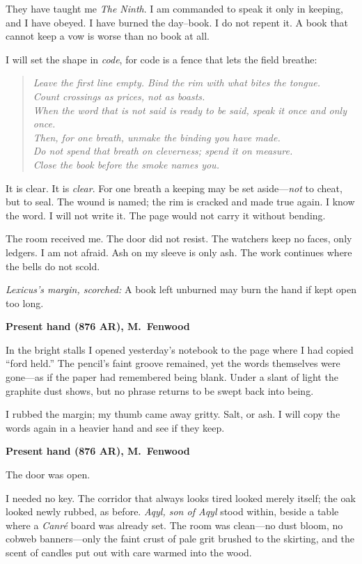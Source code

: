 \documentclass[11pt]{article}
\numberwithin{equation}{section} %
\theoremstyle{plain} %
\theoremstyle{definition} %
\theoremstyle{remark} %
\begin{document}
They have taught me \emph{The Ninth}. I am commanded to speak it only in keeping, and I have obeyed. I have burned the day–book. I do not repent it. A book that cannot keep a vow is worse than no book at all.

I will set the shape in \emph{code}, for code is a fence that lets the field breathe:

\begin{quote}\small
\textit{Leave the first line empty. Bind the rim with what bites the tongue.\\
Count crossings as prices, not as boasts.\\
When the word that is not said is ready to be said, speak it once and only once.\\
Then, for one breath, unmake the binding you have made.\\
Do not spend that breath on cleverness; spend it on measure.\\
Close the book before the smoke names you.}
\end{quote}

It is clear. It is \emph{clear}. For one breath a keeping may be set aside—\emph{not} to cheat, but to seal. The wound is named; the rim is cracked and made true again. I know the word. I will not write it. The page would not carry it without bending.

The room received me. The door did not resist. The watchers keep no faces, only ledgers. I am not afraid. Ash on my sleeve is only ash. The work continues where the bells do not scold.

\medskip
\noindent\textit{Lexicus’s margin, scorched:} A book left unburned may burn the hand if kept open too long.

\medskip
\noindent\textbf{Present hand (876 AR), M.\ Fenwood}

In the bright stalls I opened yesterday’s notebook to the page where I had copied “ford held.” The pencil’s faint groove remained, yet the words themselves were gone—as if the paper had remembered being blank. Under a slant of light the graphite dust shows, but no phrase returns to be swept back into being.

I rubbed the margin; my thumb came away gritty. Salt, or ash. I will copy the words again in a heavier hand and see if they keep.

\medskip
\noindent\textbf{Present hand (876 AR), M.\ Fenwood}

The door was open.

I needed no key. The corridor that always looks tired looked merely itself; the oak looked newly rubbed, as before. \textit{Aqyl, son of Aqyl} stood within, beside a table where a \emph{Canr\'e} board was already set. The room was clean—no dust bloom, no cobweb banners—only the faint crust of pale grit brushed to the skirting, and the scent of candles put out with care warmed into the wood.
\end{document}

